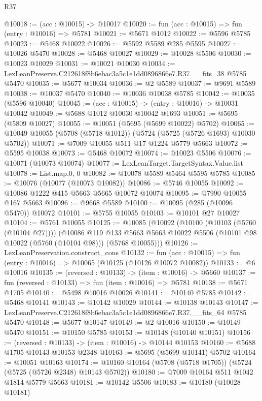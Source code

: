 \begin{lexlean}{R37}
\begin{coremodule}
@10018 := (acc : @10015) -> @10017
@10020 := fun (acc : @10015) => fun (entry : @10016) => @5781
@10021 := @5671 @1012
@10022 := @5596 @5785
@10023 := @5468 @10022
@10026 := @5592 @5589 @285 @5595
@10027 := @10026 @5470
@10028 := @5468 @10027
@10029 := @10028 @5506
@10030 := @10023 @10029
@10031 := @10021 @10030
@10034 := LexLeanPreserve.C212618f8b6ebac3a5c1e1dd0896866e7.R37.__fits_38 @5785 @5470
@10035 := @5677 @10034
@10036 := @2 @5589
@10037 := @9691 @5589
@10038 := @10037 @5470
@10040 := @10036 @10038 @5785
@10042 := @10035 (@5596 @10040)
@10045 := (acc : @10015) -> (entry : @10016) -> @10031 @10042
@10049 := @5688 @1012 @10030 @10042 @1693
@10051 := @5695 (@5809 @10027)
@10055 := @10051 (@5695 (@5699 @10022) @5702)
@10065 := @10049 @10055 (@5708 (@5718 @1012)) (@5724 (@5725 (@5726 @1693) @10030 @5702))
@10071 := @7009 @10055 @511 @17 @1224 @5779 @5663
@10072 := @5595 @10038
@10073 := @5468 @10072
@10074 := @10023 @5506
@10076 := @10071 (@10073 @10074)
@10077 := LexLeanTarget.TargetSyntax.Value.list
@10078 := List.map.{0, 0}
@10082 := @10078 @5589 @5464 @5595 @5785
@10085 := @10076 (@10077 (@10073 @10082))
@10086 := @5746 @10055
@10092 := @10086 @1222 @415 @5663 @5665 @10072 @10074
@10095 := @7990 @10055 @167 @5663
@10096 := @9668 @5589
@10100 := @10095 (@285 (@10096 @5470)) @10072
@10101 := @5755 @10055
@10103 := @10101 @27 @10027
@10104 := @5761 @10055
@10125 := @10085
    (@10092
      (@10100 (@10103 (@5760 (@10104 @27))))
      (@10086
        @119
        @133
        @5663
        @5663
        @10022
        @5506
        (@10101 @98 @10022 (@5760 (@10104 @98)))
        (@5768 @10055)))
@10126 := LexLeanPreservation.construct_cons
@10132 := fun (acc : @10015) => fun (entry : @10016) => @10065 (@10125 (@10126 @10072 @10082))
@10133 := @6 @10016
@10135 := (reversed : @10133) -> (item : @10016) -> @5660
@10137 := fun (reversed : @10133) => fun (item : @10016) => @5781
@10138 := @5671 @1705
@10140 := @5498 @10016 @10026
@10141 := @10140 @5785
@10142 := @5468 @10141
@10143 := @10142 @10029
@10144 := @10138 @10143
@10147 := LexLeanPreserve.C212618f8b6ebac3a5c1e1dd0896866e7.R37.__fits_64 @5785 @5470
@10148 := @5677 @10147
@10149 := @2 @10016
@10150 := @10149 @5470
@10151 := @10150 @5785
@10153 := @10148 (@10140 @10151)
@10156 := (reversed : @10133) -> (item : @10016) -> @10144 @10153
@10160 := @5688 @1705 @10143 @10153 @2348
@10163 := @5695 (@5699 @10141) @5702
@10164 := @10051 @10163
@10174 := @10160 @10164 (@5708 (@5718 @1705)) (@5724 (@5725 (@5726 @2348) @10143 @5702))
@10180 := @7009 @10164 @511 @1042 @1814 @5779 @5663
@10181 := @10142 @5506
@10183 := @10180 (@10028 @10181)

\end{coremodule}
\end{lexlean}
